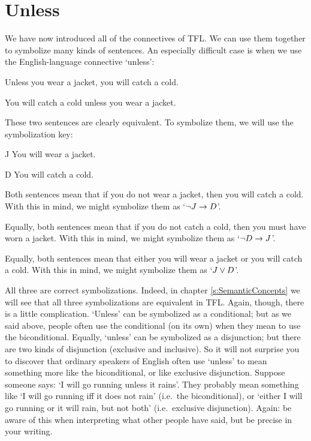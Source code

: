 \section{Unless}
We have now introduced all of the connectives of TFL. We can use them together to symbolize many kinds of sentences. An especially difficult case is when we use the English-language connective `unless':

\begin{earg}
\item[\ex{unless1}] Unless you wear a jacket, you will catch a cold. 
\item[\ex{unless2}] You will catch a cold unless you wear a jacket. 
\end{earg}
These two sentences are clearly equivalent. To symbolize them, we will use the symbolization key:
	\begin{ekey}
		\item[J] You will wear a jacket.
		\item[D] You will catch a cold.
	\end{ekey}
Both sentences mean that if you do not wear a jacket, then you will catch a cold. With this in mind, we might symbolize them as `$\neg J \rightarrow D$'. 

Equally, both sentences mean that if you do not catch a cold, then you must have worn a jacket. With this in mind, we might symbolize them as `$\neg D \rightarrow J$'.

Equally, both sentences mean that either you will wear a jacket or you will catch a cold. With this in mind, we might symbolize them as `$J \vee D$'.

All three are correct symbolizations. Indeed, in chapter \ref{s:SemanticConcepts} we will see that all three symbolizations are equivalent in TFL.
Again, though, there is a little complication. `Unless' can be symbolized as a conditional; but as we said above, people often use the conditional (on its own) when they mean to use the biconditional. Equally, `unless' can be symbolized as a disjunction; but there are two kinds of disjunction (exclusive and inclusive). So it will not surprise you to discover that ordinary speakers of English often use `unless' to mean something more like the biconditional, or like exclusive disjunction. Suppose someone says: `I will go running unless it rains'. They probably mean something like `I will go running iff it does not rain' (i.e.\ the biconditional), or  `either I will go running or it will rain, but not both' (i.e.\ exclusive disjunction). Again: be aware of this when interpreting what other people have said, but be precise in your writing.

